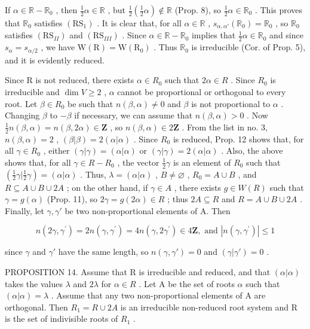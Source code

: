 If \(\alpha \in \mathbb{R} - \mathbb{R}_0\) , then \(\frac{1}{2}\alpha \in \mathbb{R}\) , but \(\frac{1}{2}\left(\frac{1}{2}\alpha\right) \notin \mathbb{R}\) (Prop. 8), so \(\frac{1}{2}\alpha \in \mathbb{R}_0\) . This proves that \(\mathbb{R}_0\) satisfies \((\mathrm{RS}_1)\) . It is clear that, for all \(\alpha \in \mathbb{R}\) , \(s_{\alpha, \alpha'}(\mathbb{R}_0) = \mathbb{R}_0\) , so \(\mathbb{R}_0\) satisfies \((\mathrm{RS}_{II})\) and \((\mathrm{RS}_{III})\) . Since \(\alpha \in \mathbb{R} - \mathbb{R}_0\) implies that \(\frac{1}{2}\alpha \in \mathbb{R}_0\) and since \(s_\alpha = s_{\alpha/2}\) , we have \(\mathrm{W}(\mathrm{R}) = \mathrm{W}(\mathrm{R}_0)\) . Thus \(\mathbb{R}_0\) is irreducible (Cor. of Prop. 5), and it is evidently reduced.

Since R is not reduced, there exists \(\alpha\in R_{0}\) such that \(2\alpha\in R\) . Since \(R_{0}\) is irreducible and \(\dim V\geqslant2\) , \(\alpha\) cannot be proportional or orthogonal to every root. Let \(\beta\in R_{0}\) be such that \(n(\beta,\alpha)\neq0\) and \(\beta\) is not proportional to \(\alpha\) . Changing \(\beta\) to \(-\beta\) if necessary, we can assume that \(n(\beta,\alpha)>0\) . Now \(\frac{1}{2}n(\beta,\alpha)=n(\beta,2\alpha)\in\mathbf{Z}\) , so \(n(\beta,\alpha)\in2\mathbf{Z}\) . From the list in no. 3, \(n(\beta,\alpha)=2\) , \((\beta|\beta)=2(\alpha|\alpha)\) . Since \(R_{0}\) is reduced, Prop. 12 shows that, for all \(\gamma\in R_{0}\) , either \((\gamma|\gamma)=(\alpha|\alpha)\) or \((\gamma|\gamma)=2(\alpha|\alpha)\) . Also, the above shows that, for all \(\gamma\in R-R_{0}\) , the vector \(\frac{1}{2}\gamma\) is an element of \(R_{0}\) such that \(\left(\frac{1}{2}\gamma|\frac{1}{2}\gamma\right)=(\alpha|\alpha)\) . Thus, \(\lambda=(\alpha|\alpha)\) , \(B\neq\varnothing\) , \(R_{0}=A\cup B\) , and \(R\subseteq A\cup B\cup2A\) ; on the other hand, if \(\gamma\in A\) , there exists \(g\in W(R)\) such that \(\gamma=g(\alpha)\) (Prop. 11), so \(2\gamma=g(2\alpha)\in R\) ; thus \(2A\subseteq R\) and \(R=A\cup B\cup2A\) . Finally, let \(\gamma,\gamma'\) be two non-proportional elements of A. Then

\[
n (2 \gamma , \gamma^ {\prime}) = 2 n (\gamma , \gamma^ {\prime}) = 4 n (\gamma , 2 \gamma^ {\prime}) \in 4 \mathbf {Z}, \text { and } | n (\gamma , \gamma^ {\prime}) | \leqslant 1
\]

since \(\gamma\) and \(\gamma'\) have the same length, so \(n(\gamma, \gamma') = 0\) and \((\gamma|\gamma') = 0\) .

PROPOSITION 14. Assume that R is irreducible and reduced, and that \((\alpha|\alpha)\) takes the values \(\lambda\) and \(2\lambda\) for \(\alpha\in R\) . Let A be the set of roots \(\alpha\) such that \((\alpha|\alpha)=\lambda\) . Assume that any two non-proportional elements of A are orthogonal. Then \(R_{1}=R\cup2A\) is an irreducible non-reduced root system and R is the set of indivisible roots of \(R_{1}\) .

